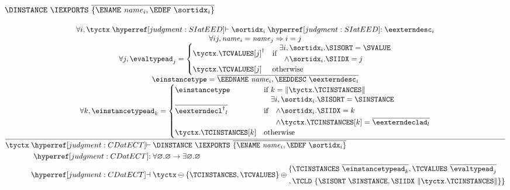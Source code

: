 \subsubsection{$\DINSTANCE~\IEXPORTS~\overline{\{ \ENAME~\name_i, \EDEF~\sortidx_i \}}$}
\[
  \frac{
    \begin{array}{@{}c@{}}
      \forall i, \tyctx \vdashh!SIatEED! \sortidx_i \trelh!SIatEED! {\eexterndesc}_i\\
      \forall i j, \name_i = \name_j \Rightarrow i = j\\
    \forall j, \evaltypead_j = \begin{cases}
       \tyctx.\TCVALUES[j]^\dagger&\text{if }\begin{aligned}\exists i,{}&\sortidx_i.\SISORT = \SVALUE\\\land{}&\sortidx_i.\SIIDX = j\\\end{aligned}\\
       \tyctx.\TCVALUES[j]&\text{otherwise}\\
    \end{cases}\\
    \einstancetype = \overline{ \EEDNAME~\name_i, \EEDDESC~{\eexterndesc}_i}\\
    \forall k, \einstancetypead_k = \begin{cases}
      \einstancetype&\text{if } k = \length{\tyctx.\TCINSTANCES}\\
      \overline{{\eexterndecl^\dagger}_l}&\text{if }
        \begin{aligned}
          \exists i,{}&\sortidx_i.\SISORT = \SINSTANCE\\
          \land{}&\sortidx_i.\SIIDX = k\\
          \land{}&\tyctx.\TCINSTANCES[k] = \overline{\eexterndeclad_l}\\
        \end{aligned}\\
      \tyctx.\TCINSTANCES[k]&\text{otherwise}
    \end{cases}
    \end{array}
  }{
    \begin{aligned}
    \tyctx \vdashh!CDatECT!{}& \DINSTANCE~\IEXPORTS~\overline{\{ \ENAME~\name_i, \EDEF~\sortidx_i \}}\\
    \trelh!CDatECT!{}& \forall\varnothing.\varnothing \to \exists\varnothing.\varnothing\\
    \dashvh!CDatECT!{}& \tyctx\ominus\{\TCINSTANCES,\TCVALUES\} \oplus \begin{aligned} \{{}& \TCINSTANCES~\overline{\einstancetypead_k},\TCVALUES~\overline{\evaltypead_j}\\,{}& \TCLD~\{ \SISORT~\SINSTANCE,\SIIDX~\length{\tyctx.\TCINSTANCES}\} \}\end{aligned}
    \end{aligned}
  }
\]

